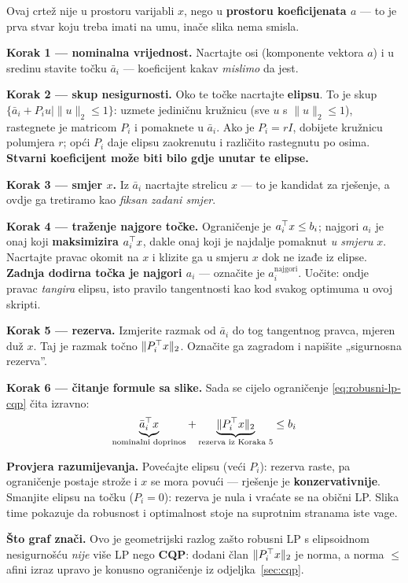 \begin{crtanje}
Ovaj crtež nije u prostoru varijabli $x$, nego u \textbf{prostoru koeficijenata
$a$} --- to je prva stvar koju treba imati na umu, inače slika nema smisla.

\textbf{Korak 1 --- nominalna vrijednost.} Nacrtajte osi (komponente vektora
$a$) i u sredinu stavite točku $\bar a_i$ --- koeficijent kakav
\emph{mislimo} da jest.

\textbf{Korak 2 --- skup nesigurnosti.} Oko te točke nacrtajte
\textbf{elipsu}. To je skup $\{\bar a_i + P_iu \mid \|u\|_2 \le 1\}$: uzmete
jediničnu kružnicu (sve $u$ s $\|u\|_2 \le 1$), rastegnete je matricom $P_i$ i
pomaknete u $\bar a_i$. Ako je $P_i = rI$, dobijete kružnicu polumjera $r$; opći
$P_i$ daje elipsu zaokrenutu i različito rastegnutu po osima. \textbf{Stvarni
koeficijent može biti bilo gdje unutar te elipse.}

\textbf{Korak 3 --- smjer $x$.} Iz $\bar a_i$ nacrtajte strelicu $x$ --- to je
kandidat za rješenje, a ovdje ga tretiramo kao \emph{fiksan zadani smjer}.

\textbf{Korak 4 --- traženje najgore točke.} Ograničenje je $a_i^{\top} x \le b_i$;
najgori $a_i$ je onaj koji \textbf{maksimizira} $a_i^{\top} x$, dakle onaj koji je
najdalje pomaknut \emph{u smjeru} $x$. Nacrtajte pravac okomit na $x$ i klizite
ga u smjeru $x$ dok ne izađe iz elipse. \textbf{Zadnja dodirna točka je najgori
$a_i$} --- označite je $a_i^{\text{najgori}}$. Uočite: ondje pravac
\emph{tangira} elipsu, isto pravilo tangentnosti kao kod svakog optimuma u ovoj
skripti.

\textbf{Korak 5 --- rezerva.} Izmjerite razmak od $\bar a_i$ do tog tangentnog
pravca, mjeren duž $x$. Taj je razmak točno $\|P_i^{\top} x\|_2$. Označite ga
zagradom i napišite „sigurnosna rezerva”.

\textbf{Korak 6 --- čitanje formule sa slike.} Sada se cijelo ograničenje
\eqref{eq:robusni-lp-cqp} čita izravno:
\[
\underbrace{\bar a_i^{\top} x}_{\text{nominalni doprinos}}
+ \underbrace{\|P_i^{\top} x\|_2}_{\text{rezerva iz Koraka 5}} \le b_i
\]

\textbf{Provjera razumijevanja.} Povećajte elipsu (veći $P_i$): rezerva raste,
pa ograničenje postaje strože i $x$ se mora povući --- rješenje je
\textbf{konzervativnije}. Smanjite elipsu na točku ($P_i = 0$): rezerva je nula
i vraćate se na obični LP. Slika time pokazuje da robusnost i optimalnost stoje
na suprotnim stranama iste vage.

\textbf{Što graf znači.} Ovo je geometrijski razlog zašto robusni LP s
elipsoidnom nesigurnošću \emph{nije} više LP nego \textbf{CQP}: dodani član
$\|P_i^{\top} x\|_2$ je norma, a norma $\le$ afini izraz upravo je konusno
ograničenje iz odjeljka~\ref{sec:cqp}.
\end{crtanje}

